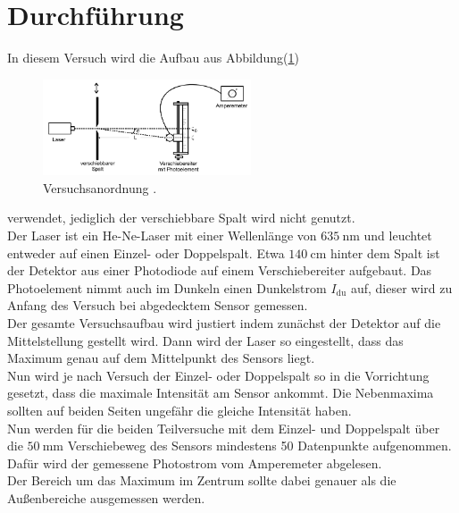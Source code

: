 \section{Durchführung}

    \noindent In diesem Versuch wird die Aufbau aus Abbildung(\ref{img:Versuch})

    \begin{figure}[ht]
        \centering
        \includegraphics[width=0.55\textwidth]{latex/images/Versuch.PNG}
        \caption{Versuchsanordnung \protect \cite{V406}.}
        \label{img:Versuch}
    \end{figure}

    \noindent verwendet, jediglich der verschiebbare Spalt wird nicht genutzt.\\ Der Laser ist ein He-Ne-Laser mit einer Wellenlänge von 
    $\SI{635}{\nano\meter}$ und leuchtet entweder auf einen Einzel- oder Doppelspalt. Etwa $\SI{140}{\centi\meter}$ hinter dem Spalt ist der 
    Detektor aus einer Photodiode auf einem Verschiebereiter aufgebaut. Das Photoelement nimmt auch im Dunkeln einen Dunkelstrom
    $I_{\text{du}}$ auf, dieser wird zu Anfang des Versuch bei abgedecktem Sensor gemessen.\\

    \noindent Der gesamte Versuchsaufbau wird justiert indem zunächst der Detektor auf die Mittelstellung gestellt wird. Dann wird der Laser so eingestellt, 
    dass das Maximum genau auf dem Mittelpunkt des Sensors liegt.\\ Nun wird je nach Versuch der Einzel- oder Doppelspalt so in die Vorrichtung 
    gesetzt, dass die maximale Intensität am Sensor ankommt. Die Nebenmaxima sollten auf beiden Seiten ungefähr die gleiche Intensität haben.\\

    \noindent Nun werden für die beiden Teilversuche mit dem Einzel- und Doppelspalt über die $\SI{50}{\milli\meter}$ Verschiebeweg des Sensors
    mindestens 50 Datenpunkte aufgenommen. Dafür wird der gemessene Photostrom vom Amperemeter abgelesen.\\
    Der Bereich um das Maximum im Zentrum sollte dabei genauer als die Außenbereiche ausgemessen werden.


    
